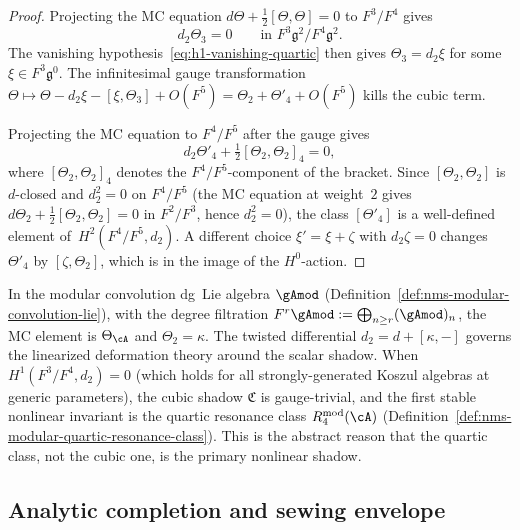 \begin{proof}
Projecting the MC equation
$d\Theta + \tfrac{1}{2}[\Theta, \Theta] = 0$
to $F^3 / F^4$ gives
\[
d_2 \Theta_3 = 0
\qquad\text{in } F^3 \mathfrak{g}^2 / F^4 \mathfrak{g}^2.
\]
The vanishing hypothesis~\eqref{eq:h1-vanishing-quartic} then gives
$\Theta_3 = d_2 \xi$ for some
$\xi \in F^3 \mathfrak{g}^0$. The infinitesimal gauge
transformation $\Theta \mapsto \Theta - d_2 \xi
- [\xi, \Theta_3] + O(F^5) = \Theta_2 + \Theta'_4 + O(F^5)$
kills the cubic term.

Projecting the MC equation to $F^4 / F^5$ after the gauge gives
\[
d_2 \Theta'_4 + \tfrac{1}{2}[\Theta_2, \Theta_2]_4 = 0,
\]
where $[\Theta_2, \Theta_2]_4$ denotes the $F^4/F^5$-component of
the bracket. Since $[\Theta_2, \Theta_2]$ is $d$-closed and
$d_2^2 = 0$ on $F^4/F^5$ (the MC equation at weight~$2$ gives
$d\Theta_2 + \tfrac{1}{2}[\Theta_2, \Theta_2] = 0$ in $F^2/F^3$,
hence $d_2^2 = 0$), the class $[\Theta'_4]$ is a well-defined
element of~$H^2(F^4/F^5, d_2)$. A different choice
$\xi' = \xi + \zeta$ with $d_2 \zeta = 0$ changes $\Theta'_4$ by
$[\zeta, \Theta_2]$, which is in the image of the $H^0$-action.
\end{proof}

\begin{remark}
\label{rem:quartic-stability-shadow-application}
In the modular convolution dg~Lie algebra
$\gAmod$
(Definition~\ref{def:nms-modular-convolution-lie}), with the degree
filtration $F^r \gAmod := \bigoplus_{n \geq r}
(\gAmod)_n$, the MC element is $\Theta_\cA$ and $\Theta_2 = \kappa$.
The twisted differential $d_2 = d + [\kappa, -]$ governs the
linearized deformation theory around the scalar shadow. When
$H^1(F^3/F^4, d_2) = 0$ (which holds for all
strongly-generated Koszul algebras at generic parameters), the cubic
shadow $\mathfrak{C}$ is gauge-trivial, and the first stable
nonlinear invariant is the quartic resonance class
$R^{\mathrm{mod}}_4(\cA)$
(Definition~\ref{def:nms-modular-quartic-resonance-class}). This
is the abstract reason that the quartic class, not the cubic one,
is the primary nonlinear shadow.
\end{remark}


\subsection{Analytic completion and sewing envelope}
\label{subsec:analytic-completion-sewing-envelope}

